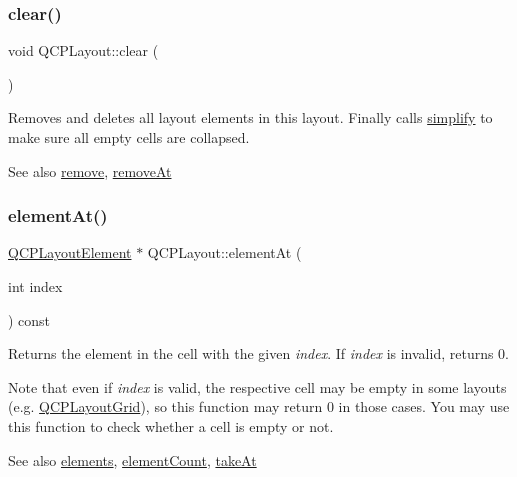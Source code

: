 \subsubsection{\texorpdfstring{clear()}{clear()}}
{\footnotesize\ttfamily void Q\+C\+P\+Layout\+::clear (\begin{DoxyParamCaption}{ }\end{DoxyParamCaption})}

Removes and deletes all layout elements in this layout. Finally calls \hyperlink{class_q_c_p_layout_a41e6ac049143866e8f8b4964efab01b2}{simplify} to make sure all empty cells are collapsed.

\begin{DoxySeeAlso}{See also}
\hyperlink{class_q_c_p_layout_a6c58f537d8086f352576ab7c5b15d0bc}{remove}, \hyperlink{class_q_c_p_layout_a2403f684fee3ce47132faaeed00bb066}{remove\+At} 
\end{DoxySeeAlso}
\mbox{\label{class_q_c_p_layout_afa73ca7d859f8a3ee5c73c9b353d2a56}} 
\subsubsection{\texorpdfstring{element\+At()}{elementAt()}}
{\footnotesize\ttfamily \hyperlink{class_q_c_p_layout_element}{Q\+C\+P\+Layout\+Element} $\ast$ Q\+C\+P\+Layout\+::element\+At (\begin{DoxyParamCaption}\item[{int}]{index }\end{DoxyParamCaption}) const\hspace{0.3cm}{\ttfamily [pure virtual]}}

Returns the element in the cell with the given {\itshape index}. If {\itshape index} is invalid, returns 0.

Note that even if {\itshape index} is valid, the respective cell may be empty in some layouts (e.\+g. \hyperlink{class_q_c_p_layout_grid}{Q\+C\+P\+Layout\+Grid}), so this function may return 0 in those cases. You may use this function to check whether a cell is empty or not.

\begin{DoxySeeAlso}{See also}
\hyperlink{class_q_c_p_layout_aca129722c019f91d3367046f80abfa77}{elements}, \hyperlink{class_q_c_p_layout_a39d3e9ef5d9b82ab1885ba1cb9597e56}{element\+Count}, \hyperlink{class_q_c_p_layout_a5a79621fa0a6eabb8b520cfc04fb601a}{take\+At} 
\end{DoxySeeAlso}


